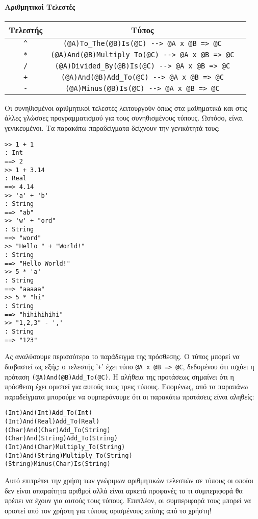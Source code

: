 \documentclass[diploma]{softlab-thesis}
\begin{document}
\paragraph{Αριθμητικοί Τελεστές}
\begin{center}
\begin{tabular}{ |c|c|c| }
\hline
Τελεστής & Τύπος
\\
\hline
\hline
\verb|^| & \verb|(@A)To_The(@B)Is(@C) --> @A x @B => @C|
\\
\hline
\verb|*| & \verb|(@A)And(@B)Multiply_To(@C) --> @A x @B => @C|
\\
\hline
\verb|/| & \verb|(@A)Divided_By(@B)Is(@C) --> @A x @B => @C|
\\
\hline
\verb|+| & \verb|(@A)And(@B)Add_To(@C) --> @A x @B => @C|
\\
\hline
\verb|-| & \verb|(@A)Minus(@B)Is(@C) --> @A x @B => @C|
\\
\hline
\end{tabular}
\end{center}
Οι συνηθισμένοι αριθμητικοί τελεστές λειτουργούν όπως στα μαθηματικά και στις
άλλες γλώσσες προγραμματισμού για τους συνηθισμένους τύπους. Ωστόσο, είναι
γενικευμένοι. Τα παρακάτω παραδείγματα δείχνουν την γενικότητά τους:
\begin{verbatim}
>> 1 + 1
: Int
==> 2
>> 1 + 3.14
: Real
==> 4.14
>> 'a' + 'b'
: String
==> "ab"
>> 'w' + "ord"
: String
==> "word"
>> "Hello " + "World!"
: String
==> "Hello World!"
>> 5 * 'a'
: String
==> "aaaaa"
>> 5 * "hi"
: String
==> "hihihihihi"
>> "1,2,3" - ','
: String
==> "123"
\end{verbatim}
Ας αναλύσουμε περισσότερο το παράδειγμα της πρόσθεσης.  Ο τύπος μπορεί να
διαβαστεί ως εξής: ο τελεστής '\verb|+|' έχει τύπο \verb|@A x @B => @C|,
δεδομένου ότι ισχύει η πρόταση \verb|(@A)And(@B)Add_To(@C)|.
Η αλήθεια της προτάσεως σημαίνει ότι η πρόσθεση έχει οριστεί για αυτούς τους
τρεις τύπους.
Επομένως, από τα παραπάνω παραδείγματα μπορούμε να συμπεράνουμε ότι οι
παρακάτω προτάσεις είναι αληθείς:
\begin{verbatim}
(Int)And(Int)Add_To(Int)
(Int)And(Real)Add_To(Real)
(Char)And(Char)Add_To(String)
(Char)And(String)Add_To(String)
(Int)And(Char)Multiply_To(String)
(Int)And(String)Multiply_To(String)
(String)Minus(Char)Is(String)
\end{verbatim}
Αυτό επιτρέπει την χρήση των γνώριμων αριθμητικών τελεστών σε τύπους οι
οποίοι δεν είναι απαραίτητα αριθμοί αλλά είναι αρκετά προφανές το τι
συμπεριφορά θα πρέπει να έχουν για αυτούς τους τύπους. Επιπλέον, οι συμπεριφορά
τους μπορεί να οριστεί από τον χρήστη για τύπους ορισμένους επίσης από το
χρήστη!
\end{document}
